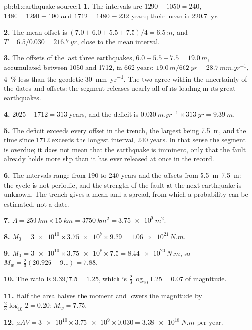 \begin{solution}{pb:b1:earthquake-source:1}
\textbf{1.} The intervals are $1290 - 1050 = 240$, $1480 - 1290 = 190$ and
$1712 - 1480 = 232$ years; their mean is \qty{220.7}{yr}.

\textbf{2.} The mean offset is $(7.0 + 6.0 + 5.5 + 7.5)/4 = \qty{6.5}{m}$, and
$T = 6.5/0.030 = \qty{216.7}{yr}$, close to the mean interval.

\textbf{3.} The offsets of the last three earthquakes, $6.0 + 5.5 + 7.5 =
\qty{19.0}{m}$, accumulated between 1050 and 1712, in 662 years: $\qty{19.0}{m}
/\qty{662}{yr} = \qty{28.7}{mm.yr^{-1}}$, \qty{4}{\percent} less than the
geodetic \qty{30}{mm.yr^{-1}}. The two agree within the uncertainty of the
dates and offsets: the segment releases nearly all of its loading in its great
earthquakes.

\textbf{4.} $2025 - 1712 = 313$ years, and the deficit is
$\qty{0.030}{m.yr^{-1}}\times\qty{313}{yr} = \qty{9.39}{m}$.

\textbf{5.} The deficit exceeds every offset in the trench, the largest being
\qty{7.5}{m}, and the time since 1712 exceeds the longest interval, 240 years.
In that sense the segment is overdue; it does not mean that the earthquake is
imminent, only that the fault already holds more slip than it has ever
released at once in the record.

\textbf{6.} The intervals range from 190 to 240 years and the offsets from
\qtyrange{5.5}{7.5}{m}: the cycle is not periodic, and the strength of the
fault at the next earthquake is unknown. The trench gives a mean and a spread,
from which a probability can be estimated, not a date.

\textbf{7.} $A = \qty{250}{km}\times\qty{15}{km} = \qty{3750}{km^2} =
\qty{3.75e9}{m^2}$.

\textbf{8.} $M_0 = \num{3e10}\times\num{3.75e9}\times\num{9.39} =
\qty{1.06e21}{N.m}$.

\textbf{9.} $M_0 = \num{3e10}\times\num{3.75e9}\times\num{7.5} =
\qty{8.44e20}{N.m}$, so $M_w = \tfrac23(20.926 - 9.1) = 7.88$.

\textbf{10.} The ratio is $9.39/7.5 = 1.25$, which is $\tfrac23\log_{10}1.25 =
0.07$ of magnitude.

\textbf{11.} Half the area halves the moment and lowers the magnitude by
$\tfrac23\log_{10}2 = 0.20$: $M_w = 7.75$.

\textbf{12.} $\mu A V = \num{3e10}\times\num{3.75e9}\times\num{0.030} =
\qty{3.38e18}{N.m}$ per year.


\end{solution}
